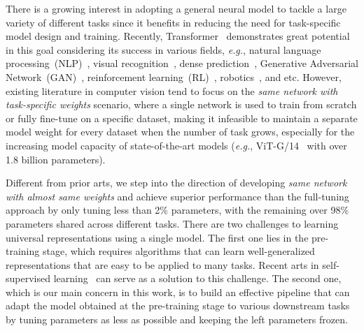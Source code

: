 There is a growing interest in adopting a general neural model to tackle a large variety of different tasks since it benefits in reducing the need for task-specific model design and training. Recently, Transformer~\cite{vaswani-nips17-transformer} demonstrates great potential in this goal considering its success in various fields, \emph{e.g.}, natural language processing~(NLP)~\cite{devlin-2018-bert, brown-nips20-gpt, wang2018glue, yang2019xlnet}, visual recognition~\cite{dosovitskiy-2020-vit, touvron2020training, yuan2021tokens, liu-iccv21-swin}, dense prediction~\cite{wang2021pyramid, carion-eccv20-detr, zhu-2020-deformabledetr, zheng2021rethinking, xie-nips21-segformer}, Generative Adversarial Network~(GAN)~\cite{jiang2021transgan, hudson2021generative}, reinforcement learning~(RL)~\cite{chen2021decision, chen2022transdreamer, yang2022learning}, robotics~\cite{jangir2022look, dasari2020transformers}, and etc. However, existing literature in computer vision tend to focus on the \emph{same network with task-specific weights} scenario, where a single network is used to train from scratch or fully fine-tune on a specific dataset, making it infeasible to maintain a separate model weight for every dataset when the number of task grows, especially for the increasing model capacity of state-of-the-art models (\emph{e.g.}, ViT-G/14~\cite{zhai2021scaling} with over 1.8 billion parameters). 

Different from prior arts, we step into the direction of developing \emph{same network with almost same weights} and achieve superior performance than the full-tuning approach by only tuning less than 2\% parameters, with the remaining over 98\% parameters shared across different tasks. There are two challenges to learning universal representations using a single model. The first one lies in the pre-training stage, which requires algorithms that can learn well-generalized representations that are easy to be applied to many tasks. Recent arts in self-supervised learning~\cite{caron2021emerging, bao-2021-beit, he-2021-mae, zhou2021ibot, wei2021masked, tong-2022-videomae, feichtenhofer2022masked} can serve as a solution to this challenge. The second one, which is our main concern in this work, is to build an effective pipeline that can adapt the model obtained at the pre-training stage to various downstream tasks by tuning parameters as less as possible and keeping the left parameters frozen. 

